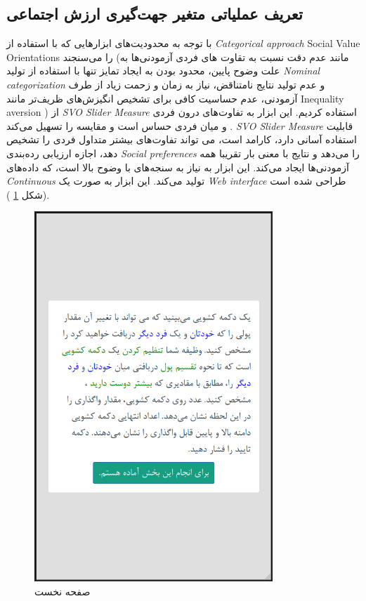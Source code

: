 \subsection{تعریف عملیاتی متغیر جهت‌گیری ارزش اجتماعی}
با توجه به محدودیت‌های ابزار‌هایی که با استفاده از
\textit{
    \gls{Categorical approach}
}
\gls{Social Value Orientations}
را می‌سنجند
(مانند عدم دقت نسبت به تقاوت های فردی آزمودنی‌ها به علت
وضوح پایین، محدود بودن به ایجاد تمایز تنها با استفاده از  تولید
\textit{
    \gls{Nominal categorization}
}
و
عدم تولید نتایج نامتناقض، نیاز به زمان و زحمت زیاد از طرف آزمودنی، عدم
حساسیت کافی برای تشخیص انگیزش‌های ظریف‌تر مانند
\gls{Inequality aversion}
)
\citep{murphyMeasuringSocialValue2011}
از
\textit{
    \gls{SVO Slider Measure}
}
استفاده کردیم. این ابزار
به تفاوت‌های درون فردی و میان فردی حساس است و مقایسه را تسهیل می‌کند
\!.
\textit{
    \gls{SVO Slider Measure}
}
قابلیت استفاده آسانی دارد، کارامد است، می تواند تفاوت‌های بیشتر متداول
فردی را تشخیص دهد،  اجازه ارزیابی رده‌بندی
\textit{
    \gls{Social preferences}
}
را می‌دهد و نتایج با معنی  بار تقریبا همه آزمودنی‌ها ایجاد می‌کند. این
ابزار به نیاز به سنجه‌های با وضوح بالا است، که داده‌های
\textit{
    \gls{Continuous}
}
تولید می‌کند.
این ابزار به صورت یک
\textit{
    \gls{Web interface}
}
طراحی شده است
\!(شکل
\ref{fig:SVOPage01}
)\!.
\begin{figure}[htpb]
    \centering
    \includegraphics[width=0.8\textwidth]{./img/SVOPage01.png}
    \caption{صفحه نخست}
    \label{fig:SVOPage01}
\end{figure}
